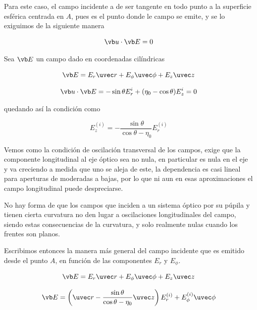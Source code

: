 Para este caso, el campo incidente a de ser tangente en todo punto a la superficie esférica centrada en $A$, pues es el punto donde le campo se emite, y se lo exiguimos de la siguiente manera 


\begin{equation}
   \vb u \cdot \vb E  = 0
\end{equation}


Sea $\vb E$ un campo dado en coordenadas cilíndricas 


\begin{equation}
    \vb E = E_r \uvec r + E_\phi \uvec \phi + E_z \uvec z
\end{equation}



\begin{equation}
   \vb u \cdot \vb E = -\sin\theta E^i_r + (\eta_0 - \cos\theta) E^i_z = 0
\end{equation}


quedando así la condición como 

\begin{equation}
    E^{(i)}_z = -\frac{\sin\theta}{\cos\theta - \eta_0} E^{(i)}_r
\end{equation}

Vemos como la condición de oscilación transversal de los campos,
exige que la componente longitudinal al eje óptico sea no nula, en particular
es nula en el eje y va creciendo a medida que uno se aleja de este, 
la dependencia es casi lineal para aperturas de moderadas a bajas, 
por lo que ni aun en esas aproximaciones el campo longitudinal puede despreciarse. 

No hay forma de que los campos que inciden a un sistema óptico por su púpila y tienen cierta curvatura no den lugar a oscilaciones longitudinales del campo, siendo estas consecuencias de la curvatura, y solo realmente nulas cuando los frentes son planos.

Escribimos entonces la manera más general del campo incidente que es emitido desde el punto $A$, en función de las componentes $E_r$ y $E_\phi$.



\begin{equation}
    \vb E = E_r \uvec r + E_\phi \uvec \phi + E_z \uvec z  
\end{equation}


\begin{equation}
    \vb E = \left(\uvec r - \frac{\sin\theta}{\cos\theta - \eta_0} \uvec z \right)E_r^{(i)} + E_\phi^{(i)} \uvec \phi
\end{equation}


